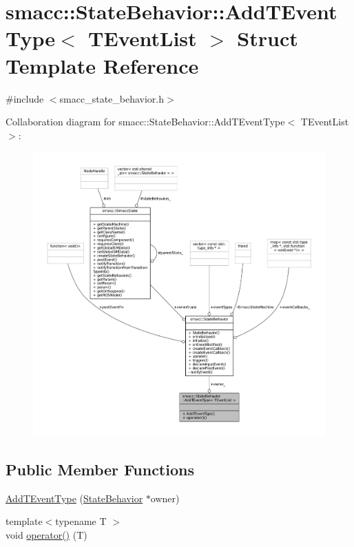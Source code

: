 \hypertarget{structsmacc_1_1StateBehavior_1_1AddTEventType}{}\section{smacc\+:\+:State\+Behavior\+:\+:Add\+T\+Event\+Type$<$ T\+Event\+List $>$ Struct Template Reference}
\label{structsmacc_1_1StateBehavior_1_1AddTEventType}


{\ttfamily \#include $<$smacc\+\_\+state\+\_\+behavior.\+h$>$}



Collaboration diagram for smacc\+:\+:State\+Behavior\+:\+:Add\+T\+Event\+Type$<$ T\+Event\+List $>$\+:
\nopagebreak
\begin{figure}[H]
\begin{center}
\leavevmode
\includegraphics[width=350pt]{structsmacc_1_1StateBehavior_1_1AddTEventType__coll__graph}
\end{center}
\end{figure}
\subsection*{Public Member Functions}
\begin{DoxyCompactItemize}
\item 
\hyperlink{structsmacc_1_1StateBehavior_1_1AddTEventType_adc780970a281836fe4750f4e98c0a8c5}{Add\+T\+Event\+Type} (\hyperlink{classsmacc_1_1StateBehavior}{State\+Behavior} $\ast$owner)
\item 
{\footnotesize template$<$typename T $>$ }\\void \hyperlink{structsmacc_1_1StateBehavior_1_1AddTEventType_a4a3bafce458c5b931d32f2aaa610b15b}{operator()} (T)
\end{DoxyCompactItemize}
